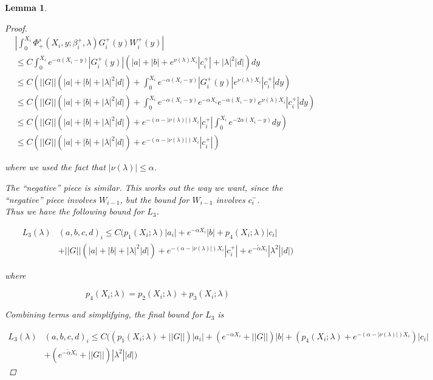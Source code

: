 \documentclass[12pt]{article}
\newtheorem{lemma}{Lemma}
\begin{document}
\begin{lemma}
\begin{proof}
\begin{align*}
&\left| \int_0^{X_i} \Phi^s_+(X_i, y; \beta_i^+, \lambda) G_i^+(y) W_i^+(y) \right| \\
&\leq C \int_0^{X_i} e^{-\alpha(X_i - y)}|G_i^+(y)|(|a| + |b| + e^{\nu(\lambda)X_i}|c_i^+| + |\lambda|^2 |d| ) dy \\
&\leq C \left( ||G||(|a| + |b| + |\lambda|^2 |d|) + \int_0^{X_i} e^{-\alpha(X_i - y)}|G_i^+(y)|e^{\nu(\lambda)X_i}|c_i^+| dy \right) \\
&\leq C \left( ||G||(|a| + |b| + |\lambda|^2 |d|) + \int_0^{X_i} e^{-\alpha(X_i - y)}e^{-\alpha X_i} e^{-\alpha(X_i - y)} e^{\nu(\lambda)X_i}|c_i^+| dy \right)\\
&\leq C \left( ||G||(|a| + |b| + |\lambda|^2 |d|) + e^{-(\alpha - |\nu(\lambda)|)X_i} |c_i^+| \int_0^{X_i} e^{-2\alpha(X_i - y)} dy \right) \\
&\leq C \left( ||G||(|a| + |b| + |\lambda|^2 |d|) + e^{-(\alpha - |\nu(\lambda)|)X_i} |c_i^+| \right)
\end{align*}

where we used the fact that $|\nu(\lambda)| \leq \alpha$.  

The ``negative'' piece is similar. This works out the way we want, since the ``negative'' piece involves $W_{i-1}$, but the bound for $W_{i-1}$ involves $c_i^-$.\\

Thus we have the following bound for $L_3$.

\begin{align*}
L_3(\lambda)&(a, b, c, d)_i \leq C ( p_1(X_i; \lambda)|a_i|
+ e^{-\alpha X_i}|b| + p_4(X_i; \lambda)|c_i| \\
&+ ||G||(|a| + |b| + |\lambda|^2 |d|) + e^{-(\alpha - |\nu(\lambda)|)X_i} |c_i^+| + e^{-\tilde{\alpha} X_i} |\lambda^2| |d| )
\end{align*}

where

\[
p_4(X_i; \lambda) = p_2(X_i; \lambda) + p_3(X_i; \lambda)
\]

Combining terms and simplifying, the final bound for $L_3$ is

\begin{align*}
L_3(\lambda)&(a, b, c, d)_i \leq C \Big( (p_1(X_i; \lambda) + ||G|| )|a_i|
+ (e^{-\alpha X_i} + ||G||)|b| + ( p_4(X_i; \lambda) + e^{-(\alpha - |\nu(\lambda)|)X_i} )|c_i| \\
&+ (e^{-\tilde{\alpha} X_i} + ||G||) |\lambda^2| |d| \Big)
\end{align*}


\end{proof}
\end{lemma}
\end{document}
